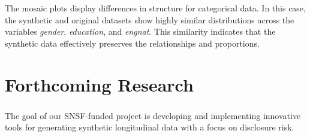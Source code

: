 \documentclass[a0,portrait]{a0poster}
\begin{document}
\begin{multicols}{3}
\vspace{1cm}

The mosaic plots display differences in structure for categorical data. In this case, the synthetic and original datasets show highly similar distributions across the variables \textit{gender}, \textit{education}, and \textit{engnat}. This similarity indicates that the synthetic data effectively preserves the relationships and proportions. %



\section{Forthcoming Research}

The goal of our SNSF\textsuperscript{}-funded project is developing and implementing innovative tools for generating synthetic longitudinal data with a focus on disclosure risk.




\singlespacing
\small
%
%



\end{multicols}
\end{document}
